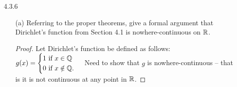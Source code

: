 \documentclass[12pt,letterpaper]{article}
\begin{document}
\begin{itemize}[leftmargin=!,labelindent=5pt]
\begin{itemize}
\begin{proof}
                        Then, we see that whenever $\abs{x-c} < \delta$ (and $x,c \in \bbZ$), it follows that $\abs{f(x) - f(c)} < \epsilon$.
                        So, any function $f$ with domain $\bbZ$ will be continuous at every point in $\bbZ$.
                    \end{proof}
                \item [(b)] Show in general that if $c$ is an isolated point of $A \subseteq \bbR$, then $f : A \to \bbR$ is continuous at $c$.
                    \begin{proof}
                        Assume $c$ is an isolated point of $A \subseteq \bbR$.
                        Need to show that $f : A \to \bbR$ is continuous at $c$, that is for all $V_\epsilon(f(c))$, there exists a $V_\delta(c)$ with the property that $x \in V_\delta(c)$ (and $x \in A$) implies $f(x) \in V_\epsilon(f(c))$.
                        Suppose $\epsilon > 0$ is arbitrary.
                        Since $c$ is an isolated point, we know from the inverse of Definition 3.2.4 that there exists a $\delta$ neighborhood $V_\delta(c)$ that intersects $A$ only at the point $c$, so $V_\delta(c) \cap A = c$.
                        Then, for all $x \in V_\delta(c)$, $x = c$ which means that $f(x) = f(c)$.
                        So, $f(x) \in V_\epsilon(f(c))$.
                        Thus, $f(x)$ is continuous at $c$ by Theorem 4.3.2 (iii).
                    \end{proof}
            \end{itemize}
        \item [4.3.6] 
            \begin{itemize}
                \item [(a)] Referring to the proper theorems, give a formal argument that Dirichlet’s function from Section 4.1 is nowhere-continuous on $\mathbb{R}$.
                    \begin{proof}
                        Let Dirichlet’s function be defined as follows:
                        \(
                            g(x) = 
                            \begin{cases}
                                1 \text{ if } x \in \mathbb{Q} \\
                                0 \text{ if } x \notin \mathbb{Q}.
                            \end{cases}
                        \)
                        Need to show that $g$ is nowhere-continuous -- that is it is not continuous at any point in $\mathbb{R}$.


\end{proof}
\end{itemize}
\end{itemize}
\end{document}
